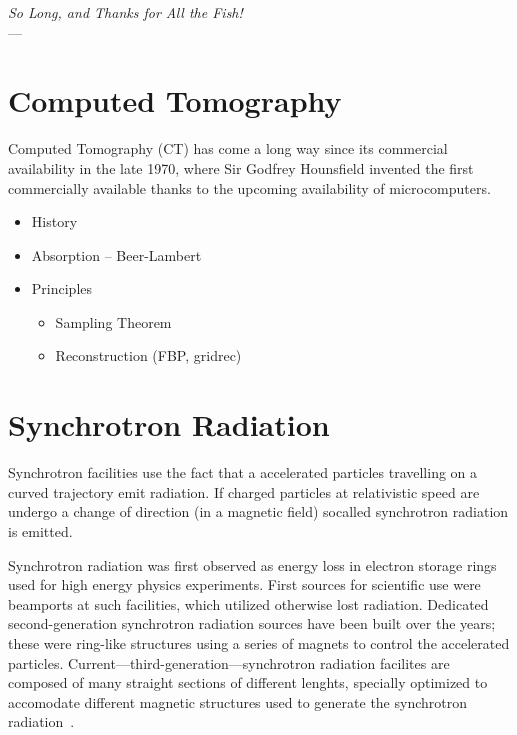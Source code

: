 \label{ch:ct}
\begin{flushright}{\slshape    
		So Long, and Thanks for All the Fish!} \\ \medskip
    ---  \citep{Adams1984}
\end{flushright}
\bigskip

\section{Computed Tomography}
Computed Tomography (\acs{CT}) has come a long way since its commercial availability in the late 1970, where Sir Godfrey Hounsfield invented the first commercially available thanks to the upcoming availability of microcomputers.

\begin{itemize}
    \item History
    \item Absorption -- Beer-Lambert
    \item Principles
    \begin{itemize}
        \item Sampling Theorem
        \item Reconstruction (FBP, gridrec)
    \end{itemize}
\end{itemize}

\section{Synchrotron Radiation}
Synchrotron facilities use the fact that a accelerated particles travelling on a curved trajectory emit radiation. If charged particles at relativistic speed are undergo a change of direction (\ie in a magnetic field) socalled synchrotron radiation is emitted. 

Synchrotron radiation was first observed as energy loss in electron storage rings used for high energy physics experiments. First sources for scientific use were beamports at such facilities, which utilized otherwise lost radiation. Dedicated second-generation synchrotron radiation sources have been built over the years; these were ring-like structures using a series of magnets to control the accelerated particles. Current---third-generation---synchrotron radiation facilites are composed of many straight sections of different lenghts, specially optimized to accomodate different magnetic structures used to generate the synchrotron radiation~\cite{Stampanoni2002a,Margaritondo2002,wwwsls}. 

